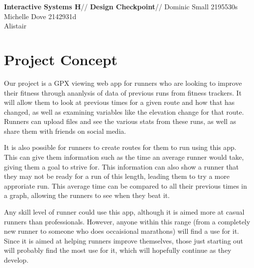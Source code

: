 \documentclass{article}
\begin{document}
\begin{center}
{\Huge \textbf{Interactive Systems H}}//
{\huge \textbf{Design Checkpoint}}//
\vspace{5mm}
Dominic Small 2195530s\\
Michelle Dove 2142931d\\
Alistair\\
\end{center}

\section{Project Concept}
\label{sec:project}
Our project is a GPX viewing web app for runners who are looking to improve their fitness through ananlysis of data of previous runs from fitness trackers. It will allow them to look at previous times for a given route and how that has changed, as well as examining variables like the elevation change for that route. Runners can upload files and see the various stats from these runs, as well as share them with friends on social media.

It is also possible for runners to create routes for them to run using this app. This can give them information such as the time an average runner would take, giving them a goal to strive for. This information can also show a runner that they may not be ready for a run of this length, leading them to try a more approriate run. This average time can be compared to all their previous times in a graph, allowing the runners to see when they beat it.

Any skill level of runner could use this app, although it is aimed more at casual runners than professionals. However, anyone within this range (from a completely new runner to someone who does occaisional marathons) will find a use for it. Since it is aimed at helping runners improve themselves, those just starting out will probably find the most use for it, which will hopefully continue as they develop.
\end{document}
